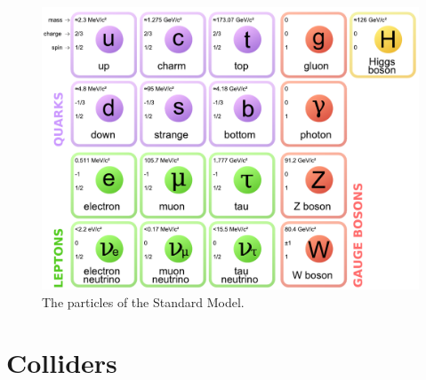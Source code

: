  
 \begin{figure}[!htbp]
    \centering
    \includegraphics[width=\textwidth]{figures/standard_model.pdf}
    \caption[
        The particles of the Standard Model.
    ]{
      The particles of the Standard Model.
    }
    \label{fig:ParticleTable}
\end{figure}
 
\section{Colliders}

